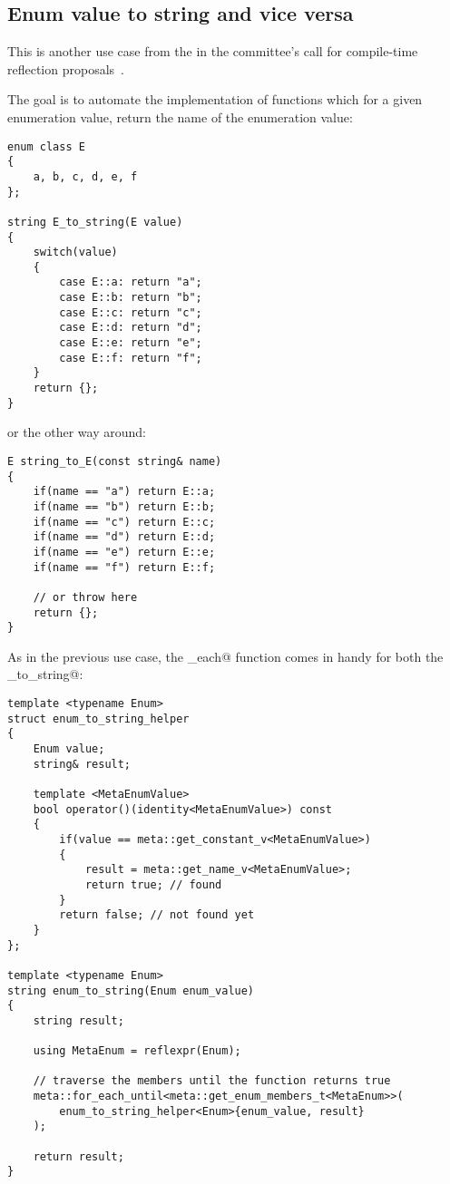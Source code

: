 \subsection{Enum value to string and vice versa}
\label{use-case-enum-to-string}

This is another use case from the  in the committee's
call for compile-time reflection proposals~\cite{ISOCPP-N3814}. 

The goal is to automate the implementation of functions which for a given
enumeration value, return the name of the enumeration value:

\begin{verbatim}
enum class E
{
	a, b, c, d, e, f
};

string E_to_string(E value)
{
	switch(value)
	{
		case E::a: return "a";
		case E::b: return "b";
		case E::c: return "c";
		case E::d: return "d";
		case E::e: return "e";
		case E::f: return "f";
	}
	return {};
}
\end{verbatim}

or the other way around:

\begin{verbatim}
E string_to_E(const string& name)
{
	if(name == "a") return E::a;
	if(name == "b") return E::b;
	if(name == "c") return E::c;
	if(name == "d") return E::d;
	if(name == "e") return E::e;
	if(name == "f") return E::f;

	// or throw here
	return {};
}
\end{verbatim}

As in the previous use case, the \verb@for_each@ function comes in handy
for both the \verb@enum_to_string@:

\begin{verbatim}
template <typename Enum>
struct enum_to_string_helper
{
	Enum value;
	string& result;

	template <MetaEnumValue>
	bool operator()(identity<MetaEnumValue>) const
	{
		if(value == meta::get_constant_v<MetaEnumValue>)
		{
			result = meta::get_name_v<MetaEnumValue>;
			return true; // found
		}
		return false; // not found yet
	}
};

template <typename Enum>
string enum_to_string(Enum enum_value)
{
	string result;

	using MetaEnum = reflexpr(Enum);

	// traverse the members until the function returns true
	meta::for_each_until<meta::get_enum_members_t<MetaEnum>>(
		enum_to_string_helper<Enum>{enum_value, result}
	);

	return result;
}
\end{verbatim}

